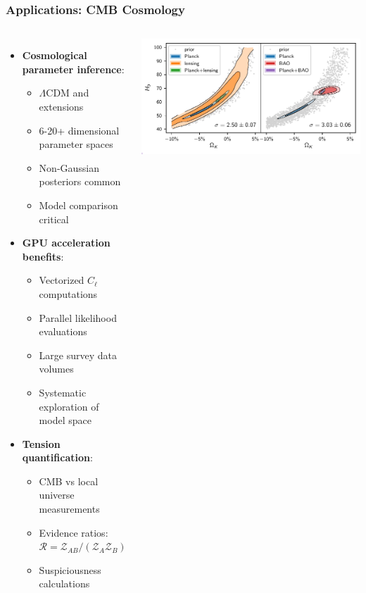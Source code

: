 \documentclass[aspectratio=169]{beamer}
\begin{document}
\begin{frame}
    \frametitle{Applications: CMB Cosmology}
    \begin{columns}
        \begin{itemize}
            \item \textbf{Cosmological parameter inference}:
                \begin{itemize}
                    \item $\Lambda$CDM and extensions
                    \item 6-20+ dimensional parameter spaces
                    \item Non-Gaussian posteriors common
                    \item Model comparison critical
                \end{itemize}
            \item \textbf{GPU acceleration benefits}:
                \begin{itemize}
                    \item Vectorized $C_\ell$ computations
                    \item Parallel likelihood evaluations
                    \item Large survey data volumes
                    \item Systematic exploration of model space
                \end{itemize}
            \item \textbf{Tension quantification}:
                \begin{itemize}
                    \item CMB vs local universe measurements
                    \item Evidence ratios: $\mathcal{R} = \mathcal{Z}_{AB}/(\mathcal{Z}_A \mathcal{Z}_B)$
                    \item Suspiciousness calculations
                \end{itemize}
        \end{itemize}
        \includegraphics[width=\textwidth]{figures/omegak_H0_2}

\end{columns}
\end{frame}
\end{document}
